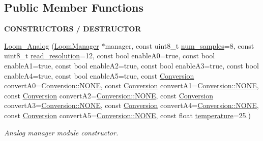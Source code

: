\subsection*{Public Member Functions}
\begin{Indent}{\bf C\+O\+N\+S\+T\+R\+U\+C\+T\+O\+RS / D\+E\+S\+T\+R\+U\+C\+T\+OR}\par
\begin{DoxyCompactItemize}
\item 
\hyperlink{class_loom___analog_a3ce93ee8e03835045eb176828cc27add}{Loom\+\_\+\+Analog} (\hyperlink{class_loom_manager}{Loom\+Manager} $\ast$manager, const uint8\+\_\+t \hyperlink{class_loom_sensor_a0e74ebbaecde15ed1c71e1bb6bc6aebe}{num\+\_\+samples}=8, const uint8\+\_\+t \hyperlink{class_loom___analog_a8593018496b601b75eec9a1df44574fb}{read\+\_\+resolution}=12, const bool enable\+A0=true, const bool enable\+A1=true, const bool enable\+A2=true, const bool enable\+A3=true, const bool enable\+A4=true, const bool enable\+A5=true, const \hyperlink{class_loom___analog_a83079adfd115a272351323429cefad46}{Conversion} convert\+A0=\hyperlink{class_loom___analog_a83079adfd115a272351323429cefad46ab50339a10e1de285ac99d4c3990b8693}{Conversion\+::\+N\+O\+NE}, const \hyperlink{class_loom___analog_a83079adfd115a272351323429cefad46}{Conversion} convert\+A1=\hyperlink{class_loom___analog_a83079adfd115a272351323429cefad46ab50339a10e1de285ac99d4c3990b8693}{Conversion\+::\+N\+O\+NE}, const \hyperlink{class_loom___analog_a83079adfd115a272351323429cefad46}{Conversion} convert\+A2=\hyperlink{class_loom___analog_a83079adfd115a272351323429cefad46ab50339a10e1de285ac99d4c3990b8693}{Conversion\+::\+N\+O\+NE}, const \hyperlink{class_loom___analog_a83079adfd115a272351323429cefad46}{Conversion} convert\+A3=\hyperlink{class_loom___analog_a83079adfd115a272351323429cefad46ab50339a10e1de285ac99d4c3990b8693}{Conversion\+::\+N\+O\+NE}, const \hyperlink{class_loom___analog_a83079adfd115a272351323429cefad46}{Conversion} convert\+A4=\hyperlink{class_loom___analog_a83079adfd115a272351323429cefad46ab50339a10e1de285ac99d4c3990b8693}{Conversion\+::\+N\+O\+NE}, const \hyperlink{class_loom___analog_a83079adfd115a272351323429cefad46}{Conversion} convert\+A5=\hyperlink{class_loom___analog_a83079adfd115a272351323429cefad46ab50339a10e1de285ac99d4c3990b8693}{Conversion\+::\+N\+O\+NE}, const float \hyperlink{class_loom___analog_ad01ead292b5fecf5178cd1baf9354ac3}{temperature}=25.)
\begin{DoxyCompactList}\small\item\em Analog manager module constructor. \end{DoxyCompactList}\item 

\end{DoxyCompactItemize}
\end{Indent}
